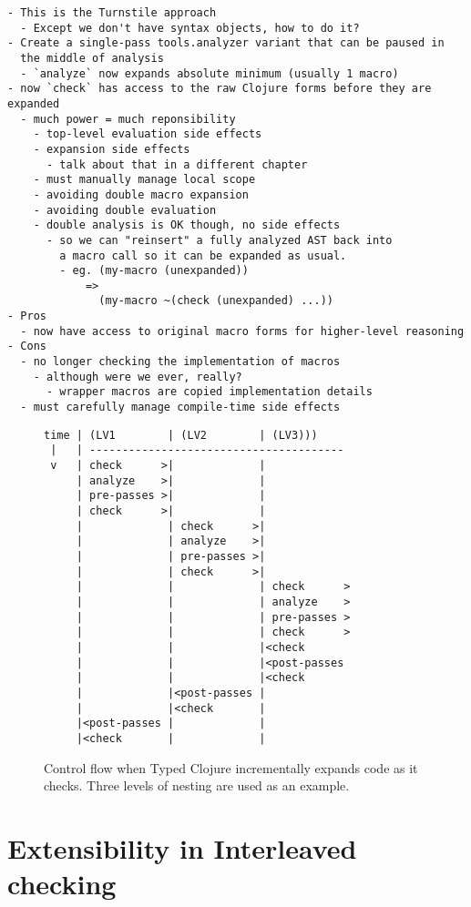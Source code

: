 {
\singlespacing
\begin{verbatim}
- This is the Turnstile approach
  - Except we don't have syntax objects, how to do it?
- Create a single-pass tools.analyzer variant that can be paused in
  the middle of analysis
  - `analyze` now expands absolute minimum (usually 1 macro)
- now `check` has access to the raw Clojure forms before they are expanded
  - much power = much reponsibility
    - top-level evaluation side effects
    - expansion side effects
      - talk about that in a different chapter
    - must manually manage local scope
    - avoiding double macro expansion
    - avoiding double evaluation
    - double analysis is OK though, no side effects
      - so we can "reinsert" a fully analyzed AST back into
        a macro call so it can be expanded as usual.
        - eg. (my-macro (unexpanded))
            =>
              (my-macro ~(check (unexpanded) ...))
- Pros
  - now have access to original macro forms for higher-level reasoning
- Cons
  - no longer checking the implementation of macros
    - although were we ever, really?
      - wrapper macros are copied implementation details
  - must carefully manage compile-time side effects
\end{verbatim}
}

\begin{figure*}
\singlespacing
\begin{verbatim}
time | (LV1        | (LV2        | (LV3)))
 |   | ---------------------------------------
 v   | check      >|             |
     | analyze    >|             |
     | pre-passes >|             |
     | check      >|             |
     |             | check      >|
     |             | analyze    >|
     |             | pre-passes >|
     |             | check      >|
     |             |             | check      >
     |             |             | analyze    >
     |             |             | pre-passes >
     |             |             | check      >
     |             |             |<check
     |             |             |<post-passes
     |             |             |<check
     |             |<post-passes |
     |             |<check       |
     |<post-passes |             |
     |<check       |             |
\end{verbatim}
  \caption{Control flow when Typed Clojure incrementally expands code as it checks.
  Three levels of nesting are used as an example.
  }
\end{figure*}

\chapter{Extensibility in Interleaved checking}

